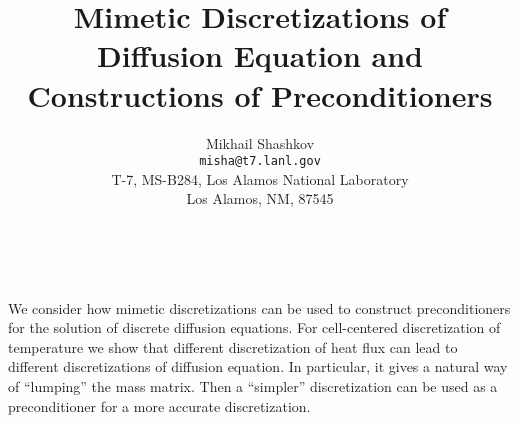 \documentclass[11pt]{article}
\date{ ~ \hspace{-4mm}}
\title{Mimetic Discretizations of Diffusion Equation and Constructions of Preconditioners  }
\author{Mikhail Shashkov \\ {\tt misha@t7.lanl.gov} \\ T-7, MS-B284, Los Alamos National Laboratory \\ Los Alamos, NM, 87545}
\begin{document}
\maketitle
\thispagestyle{empty}





 



We consider how mimetic discretizations can be used to construct
preconditioners for the solution of discrete diffusion equations.
For cell-centered discretization of temperature we show that different
discretization of heat flux can lead to different discretizations 
of diffusion equation. In particular, it gives a natural way of
``lumping'' the mass matrix. Then a ``simpler'' discretization can
be used as a preconditioner for a more accurate discretization.
\end{document}
